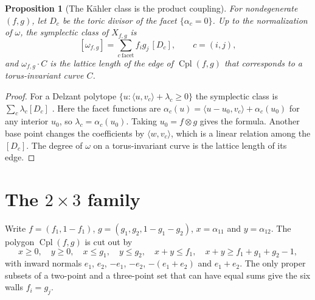 \documentclass[11pt]{article}
\newtheorem{proposition}[theorem]{Proposition}
\theoremstyle{definition}
\theoremstyle{remark}
\newcommand{\Cpl}{\operatorname{Cpl}}
\begin{document}
\begin{proposition}[The Kähler class is the product coupling]\label{prop:kahler}
For nondegenerate $(f,g)$, let $D_c$ be the toric divisor of the facet $\{\alpha_c=0\}$. Up to the
normalization of $\omega$, the symplectic class of $X_{f,g}$ is
\[
[\omega_{f,g}]=\sum_{c\ \text{facet}}f_ig_j\,[D_c],\qquad c=(i,j),
\]
and $\omega_{f,g}\cdot C$ is the lattice length of the edge of $\Cpl(f,g)$ that corresponds to a
torus-invariant curve $C$.
\end{proposition}
\begin{proof}
For a Delzant polytope $\{u:\langle u,v_c\rangle+\lambda_c\ge0\}$ the symplectic class is
$\sum_c\lambda_c[D_c]$ \cite{Guillemin1994}. Here the facet functions are
$\alpha_c(u)=\langle u-u_0,v_c\rangle+\alpha_c(u_0)$ for any interior $u_0$, so $\lambda_c=\alpha_c(u_0)$.
Taking $u_0=f\otimes g$ gives the formula. Another base point changes the coefficients by
$\langle w,v_c\rangle$, which is a linear relation among the $[D_c]$. The degree of $\omega$ on a torus-invariant
curve is the lattice length of its edge.
\end{proof}

\section{The $2\times3$ family}\label{sec:2x3}

Write $f=(f_1,1-f_1)$, $g=(g_1,g_2,1-g_1-g_2)$, $x=\alpha_{11}$ and $y=\alpha_{12}$. The polygon
$\Cpl(f,g)$ is cut out by
\[
x\ge0,\quad y\ge0,\quad x\le g_1,\quad y\le g_2,\quad x+y\le f_1,\quad x+y\ge f_1+g_1+g_2-1,
\]
with inward normals $e_1$, $e_2$, $-e_1$, $-e_2$, $-(e_1+e_2)$ and $e_1+e_2$. The only proper subsets of a
two-point and a three-point set that can have equal sums give the six walls $f_i=g_j$.
\end{document}
